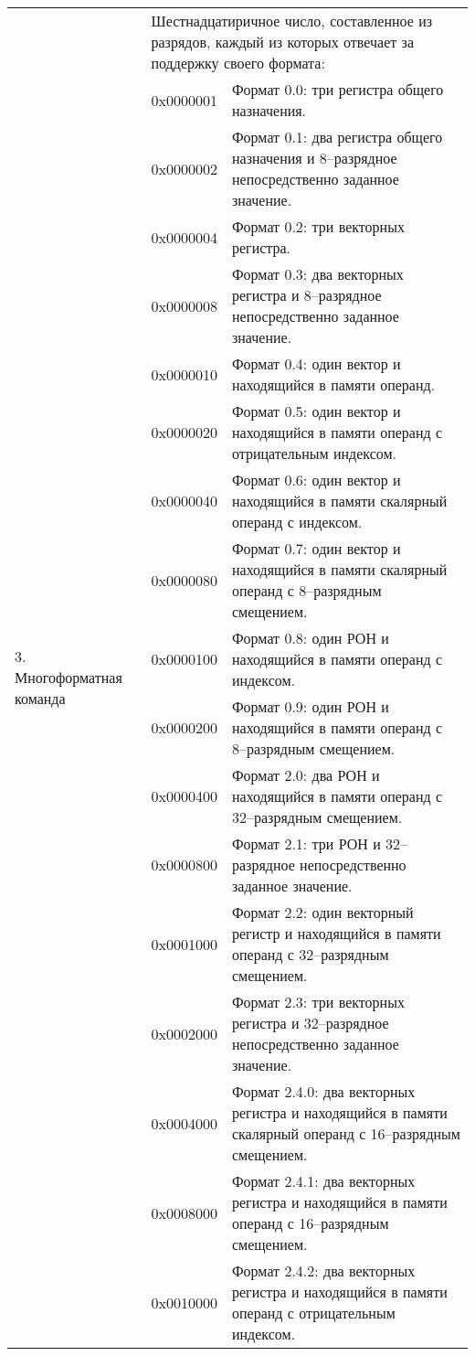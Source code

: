 \documentclass[forwardcom.tex]{subfiles}
\begin{document}
\begin{longtable} {|p{26mm}|p{16mm} p{100mm}|}
\multirow{27}{*}{\parbox[t]{26mm}{3. Многоформатная команда}} 
	&  \multicolumn{2}{|p{120mm}|}{Шестнадцатиричное число, составленное из разрядов, каждый из которых отвечает за поддержку своего формата:} \\
	&  0x0000001 & Формат 0.0: три регистра общего назначения. \\
	&  0x0000002 & Формат 0.1: два регистра общего назначения и 8--разрядное непосредственно заданное значение. \\
	&  0x0000004 & Формат 0.2: три векторных регистра. \\
	&  0x0000008 & Формат 0.3: два векторных регистра и 8--разрядное непосредственно заданное значение. \\
	&  0x0000010 & Формат 0.4: один вектор и находящийся в памяти операнд. \\
	&  0x0000020 & Формат 0.5: один вектор и находящийся в памяти операнд с отрицательным индексом. \\
	&  0x0000040 & Формат 0.6: один вектор и находящийся в памяти скалярный операнд с индексом. \\
	&  0x0000080 & Формат 0.7: один вектор и находящийся в памяти скалярный операнд с 8--разрядным смещением. \\
	&  0x0000100 & Формат 0.8: один РОН и находящийся в памяти операнд с индексом. \\
	&  0x0000200 & Формат 0.9: один РОН и находящийся в памяти операнд с 8--разрядным смещением. \\
	&  0x0000400 & Формат 2.0: два РОН и находящийся в памяти операнд с 32--разрядным смещением. \\
	&  0x0000800 & Формат 2.1: три РОН и 32--разрядное непосредственно заданное значение. \\
	&  0x0001000 & Формат 2.2: один векторный регистр и находящийся в памяти операнд с 32--разрядным смещением. \\
	&  0x0002000 & Формат 2.3: три векторных регистра и 32--разрядное непосредственно заданное значение. \\
	&  0x0004000 & Формат 2.4.0: два векторных регистра и находящийся в памяти скалярный операнд с 16--разрядным смещением. \\
	&  0x0008000 & Формат 2.4.1: два векторных регистра и находящийся в памяти операнд с 16--разрядным смещением. \\
	&  0x0010000 & Формат 2.4.2: два векторных регистра и находящийся в памяти операнд с отрицательным индексом. \\

\end{longtable}
\end{document}
